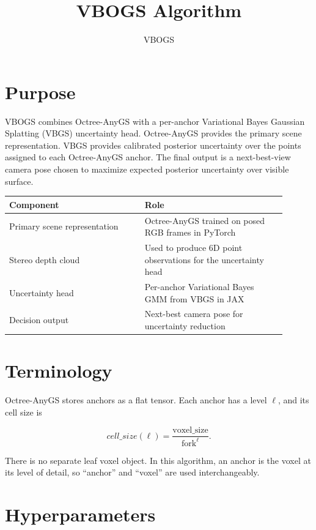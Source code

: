 \documentclass[11pt]{article}
\title{VBOGS Algorithm}
\author{VBOGS}
\date{}
\begin{document}
\maketitle

\section{Purpose}

VBOGS combines Octree-AnyGS with a per-anchor Variational Bayes Gaussian
Splatting (VBGS) uncertainty head. Octree-AnyGS provides the primary scene
representation. VBGS provides calibrated posterior uncertainty over the points
assigned to each Octree-AnyGS anchor. The final output is a next-best-view
camera pose chosen to maximize expected posterior uncertainty over visible
surface.

\begin{table}[h]
  \centering
  \footnotesize
  \begin{tabular}{@{}p{0.44\linewidth}p{0.46\linewidth}@{}}
    \toprule
    Component & Role \\
    \midrule
    Primary scene representation &
      Octree-AnyGS trained on posed RGB frames in PyTorch \\
    Stereo depth cloud &
      Used to produce 6D point observations for the uncertainty head \\
    Uncertainty head &
      Per-anchor Variational Bayes GMM from VBGS in JAX \\
    Decision output &
      Next-best camera pose for uncertainty reduction \\
    \bottomrule
  \end{tabular}
\end{table}

\section{Terminology}

Octree-AnyGS stores anchors as a flat tensor. Each anchor has a level
\(\ell\), and its cell size is

\[
  cell\_size(\ell)
  =
  \frac{\mathrm{voxel\_size}}{\mathrm{fork}^{\ell}}.
\]

There is no separate leaf voxel object. In this algorithm, an anchor is the
voxel at its level of detail, so ``anchor'' and ``voxel'' are used
interchangeably.

\section{Hyperparameters}
\end{document}

